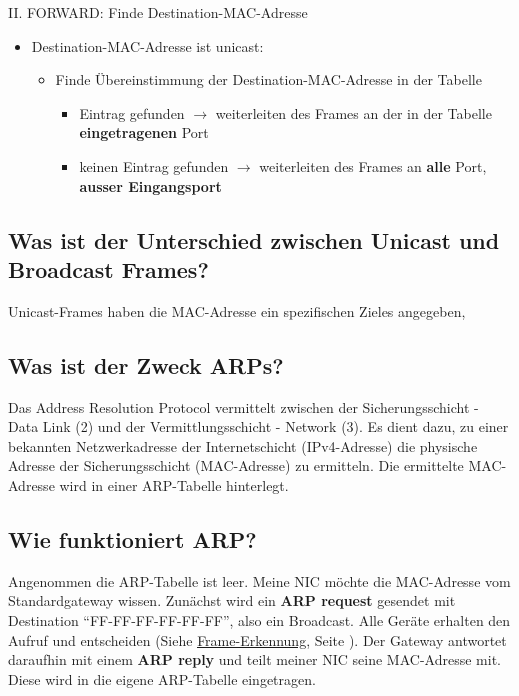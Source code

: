 II. FORWARD: Finde Destination-MAC-Adresse
\begin{itemize}
    \item Destination-MAC-Adresse ist unicast:
    \begin{itemize}
        \item Finde Übereinstimmung der Destination-MAC-Adresse in der Tabelle
        \begin{itemize}
            \item Eintrag gefunden $\rightarrow$ weiterleiten des Frames an der in der Tabelle \textbf{eingetragenen} Port
            \item keinen Eintrag gefunden $\rightarrow$ weiterleiten des Frames an \textbf{alle} Port, \textbf{ausser Eingangsport}
        \end{itemize}
    \end{itemize}
\end{itemize}

\subsection*{Was ist der Unterschied zwischen \flqq Unicast\frqq{} und \flqq Broadcast\frqq{} Frames?}
Unicast-Frames haben die MAC-Adresse ein spezifischen Zieles angegeben,

\subsection*{Was ist der Zweck ARPs?}
Das Address Resolution Protocol vermittelt zwischen der Sicherungsschicht - Data Link (2) und der Vermittlungsschicht - Network (3). Es dient dazu, zu einer bekannten Netzwerkadresse der Internetschicht (IPv4-Adresse) die physische Adresse der Sicherungsschicht (MAC-Adresse) zu ermitteln. Die ermittelte MAC-Adresse wird in einer ARP-Tabelle hinterlegt.

\subsection*{Wie funktioniert ARP?}
Angenommen die ARP-Tabelle ist leer. Meine NIC möchte die MAC-Adresse vom Standardgateway wissen. Zunächst wird ein \textbf{ARP request} gesendet mit Destination "`FF-FF-FF-FF-FF-FF"', also ein Broadcast. Alle Geräte erhalten den Aufruf und entscheiden (Siehe \underline{\hyperref[sub:Frameerkennung]{Frame-Erkennung}}, Seite \pageref{sub:Frameerkennung}). Der Gateway antwortet daraufhin mit einem \textbf{ARP reply} und teilt meiner NIC seine MAC-Adresse mit. Diese wird in die eigene ARP-Tabelle eingetragen.
